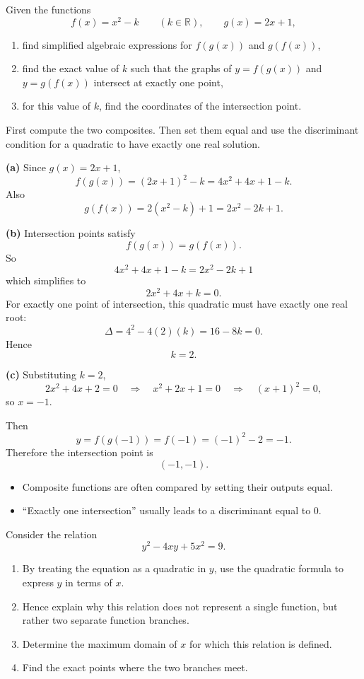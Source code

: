 \begin{problem}
Given the functions
\[
f(x)=x^2-k \qquad (k\in\mathbb{R}), \qquad g(x)=2x+1,
\]
\begin{enumerate}[label=(\alph*)]
\item find simplified algebraic expressions for $f(g(x))$ and $g(f(x))$,
\item find the exact value of $k$ such that the graphs of $y=f(g(x))$ and $y=g(f(x))$ intersect at exactly one point,
\item for this value of $k$, find the coordinates of the intersection point.
\end{enumerate}
\end{problem}

\begin{hint}
First compute the two composites. Then set them equal and use the discriminant condition for a quadratic to have exactly one real solution.
\end{hint}

\begin{solution}
\textbf{(a)} Since $g(x)=2x+1$,
\[
f(g(x))=(2x+1)^2-k=4x^2+4x+1-k.
\]
Also
\[
g(f(x))=2(x^2-k)+1=2x^2-2k+1.
\]

\textbf{(b)} Intersection points satisfy
\[
f(g(x))=g(f(x)).
\]
So
\[
4x^2+4x+1-k=2x^2-2k+1
\]
which simplifies to
\[
2x^2+4x+k=0.
\]
For exactly one point of intersection, this quadratic must have exactly one real root:
\[
\Delta=4^2-4(2)(k)=16-8k=0.
\]
Hence
\[
\boxed{k=2.}
\]

\textbf{(c)} Substituting $k=2$,
\[
2x^2+4x+2=0
\quad\Longrightarrow\quad
x^2+2x+1=0
\quad\Longrightarrow\quad
(x+1)^2=0,
\]
so $x=-1$.

Then
\[
y=f(g(-1))=f(-1)=(-1)^2-2=-1.
\]
Therefore the intersection point is
\[
\boxed{(-1,-1).}
\]
\end{solution}

\begin{takeaways}
\begin{itemize}[leftmargin=*]
\item Composite functions are often compared by setting their outputs equal.
\item “Exactly one intersection” usually leads to a discriminant equal to $0$.
\end{itemize}
\end{takeaways}

\begin{problem}
Consider the relation
\[
y^2-4xy+5x^2=9.
\]
\begin{enumerate}[label=(\alph*)]
\item By treating the equation as a quadratic in $y$, use the quadratic formula to express $y$ in terms of $x$.
\item Hence explain why this relation does not represent a single function, but rather two separate function branches.
\item Determine the maximum domain of $x$ for which this relation is defined.
\item Find the exact points where the two branches meet.
\end{enumerate}
\end{problem}

